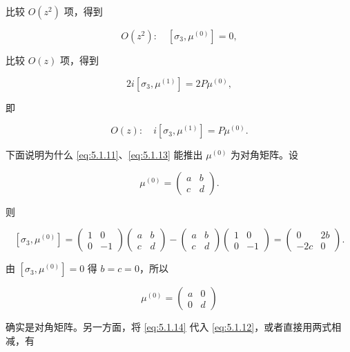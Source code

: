 \documentclass[
    lang=cn,
    scheme=chinese,
    mode=simple,
    device=normal,
    color=blue,
    math=cm,
    thmcnt=section,
    12pt
]{elegantbook}
\begin{document}
比较 $O(z^2)$ 项，得到

\begin{equation}
    O(z^2):\quad[\sigma_3,\mu^{(0)}]=0,
    \tag{5.1.13}
    \label{eq:5.1.13}
\end{equation}

比较 $O(z)$ 项，得到

\[
    2i[\sigma_3,\mu^{(1)}]=2P\mu^{(0)},
\]

即

\begin{equation}
    O(z):\quad i[\sigma_3,\mu^{(1)}]=P\mu^{(0)}.
    \tag{5.1.14}
    \label{eq:5.1.14}
\end{equation}

下面说明为什么 \eqref{eq:5.1.11}、\eqref{eq:5.1.13} 能推出 $\mu^{(0)}$ 为对角矩阵。设

\[
    \mu^{(0)}=
    \begin{pmatrix}
        a & b \\
        c & d
    \end{pmatrix}.
\]

则

\[
    [\sigma_3,\mu^{(0)}]
    =
    \begin{pmatrix}
        1 & 0 \\
        0 & -1
    \end{pmatrix}
    \begin{pmatrix}
        a & b \\
        c & d
    \end{pmatrix}
    -
    \begin{pmatrix}
        a & b \\
        c & d
    \end{pmatrix}
    \begin{pmatrix}
        1 & 0 \\
        0 & -1
    \end{pmatrix}
    =
    \begin{pmatrix}
        0  & 2b \\
        -2c & 0
    \end{pmatrix}.
\]

由 $[\sigma_3,\mu^{(0)}]=0$ 得 $b=c=0$，所以

\[
    \mu^{(0)}=
    \begin{pmatrix}
        a & 0 \\
        0 & d
    \end{pmatrix}
\]

确实是对角矩阵。另一方面，将 \eqref{eq:5.1.14} 代入 \eqref{eq:5.1.12}，或者直接用两式相减，有
\end{document}
